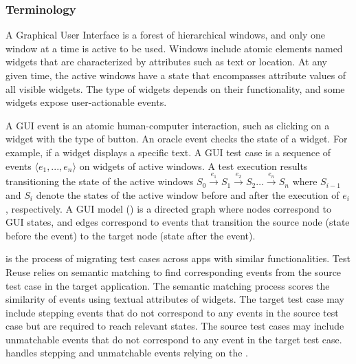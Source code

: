 \subsubsection{Terminology}
A Graphical User Interface is a forest of hierarchical windows, and only one window at a time is active to be used. Windows include atomic elements named widgets that are characterized by attributes such as text or location. At any given time, the active windows have a state that encompasses attribute values of all visible widgets. The type of widgets depends on their functionality, and some widgets expose user-actionable events. 

\smallskip
A GUI event is an atomic human-computer interaction, such as clicking on a widget with the type of button.
An oracle event checks the state of a widget. 
For example, if a widget displays a specific text. 
A GUI test case is a sequence of events $\langle e_1,..., e_n\rangle$ on widgets of active windows.
A test execution results transitioning the state of the active windows $S_{0} \xrightarrow{e_1} S_1 \xrightarrow{e_2} S_2 \ldots \xrightarrow{e_n} S_{n}$ 
where $S_{i-1}$ and $S_i$ denote the states of the active window before and after the execution of $e_i$, respectively. 
A GUI model (\tam) is a directed graph where nodes correspond to GUI states, and edges correspond to events that transition the source node (state before the event) to the target node (state after the event). 


\smallskip
\testreuse is the process of migrating test cases across apps with similar functionalities. Test Reuse relies on semantic matching to find corresponding events from the source test case in the target application. The semantic matching process scores the similarity of events using textual attributes of widgets.
The target test case may include stepping events that do not correspond to any events in the source test case but are required to reach relevant states. 
The source test cases may include unmatchable events that do not correspond to any event in the target test case. 
\testreuse handles stepping and unmatchable events relying on the \tam. 



